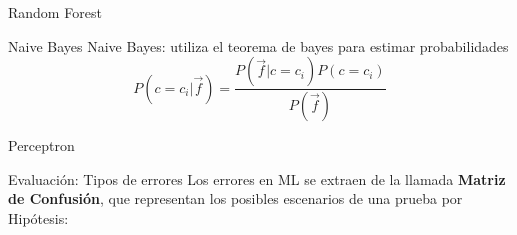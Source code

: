 \documentclass[11pt]{beamer}
\begin{document}
\begin{frame}{Random Forest}
    
\end{frame}
\begin{frame}{Naive Bayes}
    Naive Bayes: utiliza el teorema de bayes para estimar probabilidades
    $$P(c=c_i|\vec{f}) = \frac{P(\vec{f}|c=c_i)P(c=c_i)}{P(\vec{f})}$$
\end{frame}
\begin{frame}{Perceptron}
    
\end{frame}
\begin{frame}{Evaluaci\'on: Tipos de errores}
Los errores en ML se extraen de la llamada \textbf{Matriz de Confusi\'on}, 
que representan los posibles escenarios de una prueba por Hip\'otesis:


\end{frame}
\end{document}
